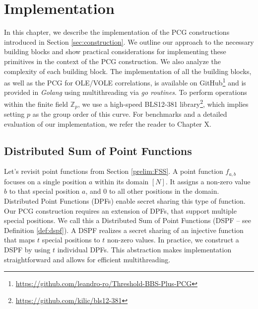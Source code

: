 \chapter{Implementation}
\label{chapter:ImplementingPCGs}
In this chapter, we describe the implementation of the PCG constructions introduced in Section \ref{sec:construction}. We outline our approach to the necessary building blocks and show practical considerations for implementing these primitives in the context of the PCG construction. We also analyze the complexity of each building block. The implementation of all the building blocks, as well as the PCG for OLE/VOLE correlations, is available on GitHub\footnote{\url{https://github.com/leandro-ro/Threshold-BBS-Plus-PCG}} and is provided in \textit{Golang} using multithreading via \textit{go routines}. To perform operations within the finite field $\mathbb{Z}_p$, we use a high-speed BLS12-381 library\footnote{\url{https://github.com/kilic/bls12-381}}, which implies setting $p$ as the group order of this curve. For benchmarks and a detailed evaluation of our implementation, we refer the reader to Chapter X.

\section{Distributed Sum of Point Functions}
Let's revisit point functions from Section \ref{prelim:FSS}.  A point function $f_{a,b}$ focuses on a single position $a$ within its domain $[N]$. It assigns a non-zero value $b$ to that special position $a$, and $0$ to all other positions in the domain. Distributed Point Functions (DPFs) enable secret sharing this type of function. Our PCG construction requires an extension of DPFs, that support multiple special positions. We call this a Distributed Sum of Point Functions (DSPF – see Definition \ref{def:dspf}). A DSPF realizes a secret sharing of an injective function that maps $t$ special positions to $t$ non-zero values. In practice, we construct a DSPF by using $t$ individual DPFs. This abstraction makes implementation straightforward and allows for efficient multithreading.

